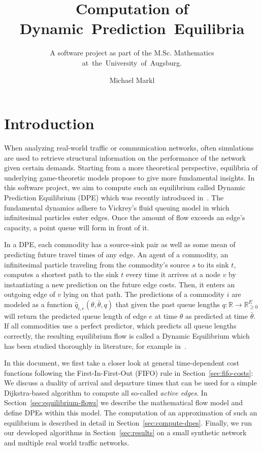 \documentclass[titlepage]{scrartcl}
\author{Michael Markl}
\title{Computation of Dynamic~Prediction~Equilibria}
\subtitle{A software project as part of the M.Sc. Mathematics at~the~University~of~Augsburg.}
\theoremstyle{definition}
\newcommand{\R}{\mathbb{R}}
\newcommand{\predq}{\hat q}
\begin{document}
    \maketitle

    \clearpage
    \tableofcontents

    \clearpage
    \section{Introduction}

    When analyzing real-world traffic or communication networks, often simulations are used to retrieve structural information on the performance of the network given certain demands.
    Starting from a more theoretical perspective, equilibria of underlying game-theoretic models propose to give more fundamental insights.
    In this software project, we aim to compute such an equilibrium called Dynamic Prediction Equilibrium (DPE) which was recently introduced in~\cite{mainpaper}.
    The fundamental dynamics adhere to Vickrey's fluid queuing model in which infinitesimal particles enter edges.
    Once the amount of flow exceeds an edge's capacity, a point queue will form in front of it.

    In a DPE, each commodity has a source-sink pair as well as some mean of predicting future travel times of any edge.
    An agent of a commodity, an infinitesimal particle traveling from the commodity's source $s$ to its sink $t$, computes a shortest path to the sink $t$ every time it arrives at a node $v$ by instantiating a new prediction on the future edge costs. Then, it enters an outgoing edge of $v$ lying on that path.
    The predictions of a commodity $i$ are modeled as a function $\predq_{i,e}(\theta, \bar\theta, q)$ that given the past queue lengths $q: \R\rightarrow \R_{\geq0}^E$ will return the predicted queue length of edge $e$ at time $\theta$ as predicted at time $\bar\theta$.
    If all commodities use a perfect predictor, which predicts all queue lengths correctly, the resulting equilibrium flow is called a Dynamic Equilibrium which has been studied thoroughly in literature, for example in~\cite{Cominetti2015}.
    

    In this document, we first take a closer look at general time-dependent cost functions following the First-In-First-Out (FIFO) rule in Section~\ref{sec:fifo-costs}:
    We discuss a duality of arrival and departure times that can be used for a simple Dijkstra-based algorithm to compute all so-called \emph{active edges}.
    In Section~\ref{sec:equilibrium-flows} we describe the mathematical flow model and define DPEs within this model.
    The computation of an approximation of such an equilibrium is described in detail in Section~\ref{sec:compute-dpes}.
    Finally, we run our developed algorithms in Section~\ref{sec:results} on a small synthetic network and multiple real world traffic networks.
\end{document}
